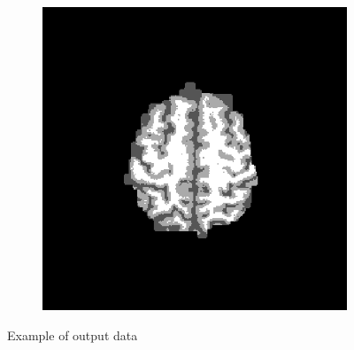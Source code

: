 \begin{figure}[H]
\begin{subfigure}[b]{0.25\linewidth}
	\end{subfigure}
	\begin{subfigure}[b]{0.25\linewidth}
		\includegraphics[width=\linewidth]{figures/Module_09/m09_18}
	\end{subfigure}
	\caption{Example of output data} 
	\label{fig:figures/m09_1678}
\end{figure} \\